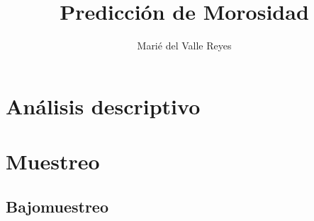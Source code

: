 \documentclass[12pt, letterpaper]{article}
\title{\textbf{Predicci\'on de Morosidad}}
\author{Mari\'e del Valle Reyes}
\date{}
\begin{document}
\maketitle

\section*{An\'alisis descriptivo}

\section*{Muestreo}

\subsection*{Bajomuestreo}
\end{document}
